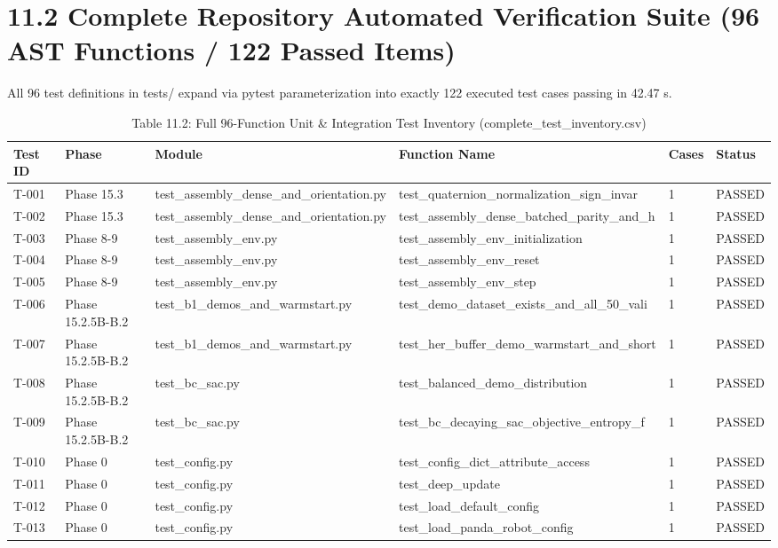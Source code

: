 \documentclass[11pt,a4paper,oneside]{book}
\begin{document}
\section{11.2 Complete Repository Automated Verification Suite (96 AST Functions / 122 Passed Items)}
All 96 test definitions in tests/ expand via pytest parameterization into exactly 122 executed test cases passing in 42.47 s.

\begin{longtable}{l l l l l l}\caption{Table 11.2: Full 96-Function Unit \& Integration Test Inventory (complete\_test\_inventory.csv)}\\\toprule
Test ID & Phase & Module & Function Name & Cases & Status \\ \midrule \endhead
T-001 & Phase 15.3 & test\_assembly\_dense\_and\_orientation.py & test\_quaternion\_normalization\_sign\_invar & 1 & PASSED \\
T-002 & Phase 15.3 & test\_assembly\_dense\_and\_orientation.py & test\_assembly\_dense\_batched\_parity\_and\_h & 1 & PASSED \\
T-003 & Phase 8-9 & test\_assembly\_env.py & test\_assembly\_env\_initialization & 1 & PASSED \\
T-004 & Phase 8-9 & test\_assembly\_env.py & test\_assembly\_env\_reset & 1 & PASSED \\
T-005 & Phase 8-9 & test\_assembly\_env.py & test\_assembly\_env\_step & 1 & PASSED \\
T-006 & Phase 15.2.5B-B.2 & test\_b1\_demos\_and\_warmstart.py & test\_demo\_dataset\_exists\_and\_all\_50\_vali & 1 & PASSED \\
T-007 & Phase 15.2.5B-B.2 & test\_b1\_demos\_and\_warmstart.py & test\_her\_buffer\_demo\_warmstart\_and\_short & 1 & PASSED \\
T-008 & Phase 15.2.5B-B.2 & test\_bc\_sac.py & test\_balanced\_demo\_distribution & 1 & PASSED \\
T-009 & Phase 15.2.5B-B.2 & test\_bc\_sac.py & test\_bc\_decaying\_sac\_objective\_entropy\_f & 1 & PASSED \\
T-010 & Phase 0 & test\_config.py & test\_config\_dict\_attribute\_access & 1 & PASSED \\
T-011 & Phase 0 & test\_config.py & test\_deep\_update & 1 & PASSED \\
T-012 & Phase 0 & test\_config.py & test\_load\_default\_config & 1 & PASSED \\
T-013 & Phase 0 & test\_config.py & test\_load\_panda\_robot\_config & 1 & PASSED \\

\end{longtable}
\end{document}
